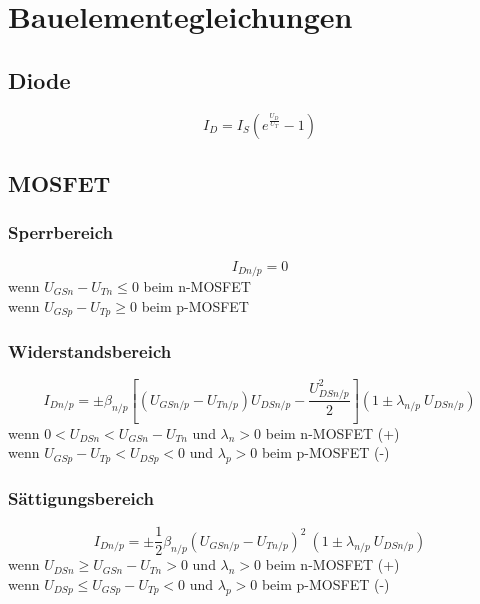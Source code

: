 \documentclass[a4paper,11pt]{article}
\begin{document}
\section*{Bauelementegleichungen}
\subsection*{Diode}
\[
	\boxed{ \quad I_D = I_S \left(e^{\frac{U_D}{U_T}}-1\right) \quad }
\]

\subsection*{MOSFET}
\subsubsection*{Sperrbereich}
\[
	I_{Dn/p} = 0
\]
wenn $ U_{GSn}-U_{Tn} \leq 0$ beim n-MOSFET\\
wenn $ U_{GSp}-U_{Tp} \geq 0$ beim p-MOSFET

\subsubsection*{Widerstandsbereich}
\[
	\boxed{ \quad I_{Dn/p} = \pm\beta_{n/p}\left[(U_{GSn/p}-U_{Tn/p}) U_{DSn/p}-\dfrac{U_{DSn/p}^2}{2}\right](1\pm\lambda_{n/p}\ U_{DSn/p}) \quad }
\]
wenn $0<U_{DSn}<U_{GSn}-U_{Tn}$ und $\lambda_n>0$ beim n-MOSFET (+)\\
wenn $U_{GSp}-U_{Tp}<U_{DSp}<0$ und $\lambda_p>0$ beim p-MOSFET (-)

\subsubsection*{Sättigungsbereich}
\[
	\boxed{ \quad I_{Dn/p}=\pm\dfrac{1}{2}\beta_{n/p}\left(U_{GSn/p}-U_{Tn/p}\right)^2\ (1\pm\lambda_{n/p}\ U_{DSn/p}) \quad }
\]
wenn $U_{DSn}\geq U_{GSn}-U_{Tn}>0$ und $\lambda_n>0$ beim n-MOSFET (+)\\
wenn $U_{DSp}\leq U_{GSp}-U_{Tp}<0$ und $\lambda_p>0$ beim p-MOSFET (-)
\end{document}
